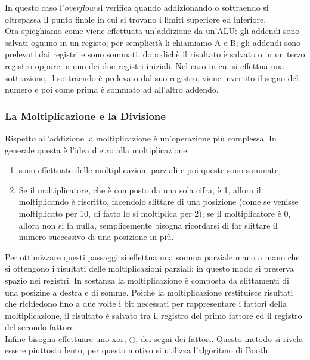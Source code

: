 \documentclass{article}
\begin{document}
In questo caso l'\textit{overflow} si verifica quando addizionando o sottraendo si oltrepassa il punto finale in cui si trovano i limiti superiore ed inferiore.\\

Ora spieghiamo come viene effettuata un'addizione da un'ALU: gli addendi sono salvati ognuno in un registo; per semplicità li chiamiamo A e B; gli addendi sono prelevati dai registri e sono sommati, dopodichè il risultato è salvato o in un terzo registro oppure in uno dei due registri iniziali. Nel caso in cui si effettua una sottrazione, il sottraendo è prelevato dal suo registro, viene invertito il segno del numero e poi come prima è sommato ad all'altro addendo.

\subsubsection{La Moltiplicazione e la Divisione}
Rispetto all'addizione la moltiplicazione è un'operazione più complessa. In generale questa è l'idea dietro alla moltiplicazione:
\begin{enumerate}
	\item sono effettuate delle moltiplicazioni parziali e poi queste sono sommate;

	\item Se il moltiplicatore, che è composto da una sola cifra, è 1, allora il moltiplicando è riscritto, facendolo slittare di una posizione (come se venisse moltiplicato per 10, di fatto lo si moltiplica per 2); se il moltiplicatore è 0, allora non si fa nulla, semplicemente bisogna ricordarsi di far slittare il numero successivo di una posizione in più.
\end{enumerate}

Per ottimizzare questi passaggi si effettua una somma parziale mano a mano che si ottengono i risultati delle moltiplicazioni parziali; in questo modo si preserva spazio nei registri. In sostanza la moltiplicazione è composta da slittamenti di una posizine a destra e di somme. Poichè la moltiplicazione restituisce risultati che richiedono fino a due volte i bit necessati per rappresentare i fattori della moltiplicazione, il risultato è salvato tra il registro del primo fattore ed il registro del secondo fattore.\\
Infine bisogna effettuare uno xor, $\oplus$, dei segni dei fattori. Questo metodo si rivela essere piuttosto lento, per questo motivo si utilizza l'algoritmo di Booth.\\
\end{document}

